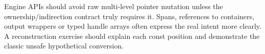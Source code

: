 Engine APIs should avoid raw multi-level pointer mutation unless the ownership/indirection contract truly requires it. Spans, references to containers, output wrappers or typed handle arrays often express the real intent more clearly. A reconstruction exercise should explain each const position and demonstrate the classic unsafe hypothetical conversion.
